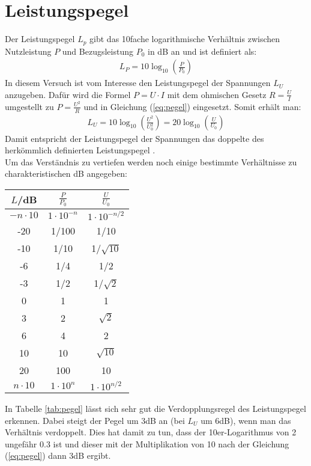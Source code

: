 \section{Leistungspegel}
\label{sec:pegel}
Der Leistungspegel $L_p$ gibt das 10fache logarithmische Verhältnis zwischen Nutzleistung $P$ und Bezugsleistung $P_0$ in \si{\deci\bel} an und ist definiert als:
\begin{gather}
    L_P = 10 \log_{10}\left(\frac{P}{P_0}\right)
    \label{eq:pegel}
\end{gather}
In diesem Versuch ist vom Interesse den Leistungspegel der Spannungen $L_U$ anzugeben. Dafür wird die Formel $P = U \cdot I$ mit dem ohmischen Gesetz $R = \frac{U}{I}$ umgestellt zu $P = \frac{U^2}{R}$ und in Gleichung (\ref{eq:pegel}) eingesetzt. Somit erhält man:
\begin{gather}
    L_U = 10 \log_{10}\left(\frac{U^2}{U_0^2}\right) = 20 \log_{10}\left(\frac{U}{U_0}\right)
    \label{eq:spannungpegel}
\end{gather}
Damit entspricht der Leistungspegel der Spannungen das doppelte des herkömmlich definierten Leistungspegel \citep{electronik}.\\
Um das Verständnis zu vertiefen werden noch einige bestimmte Verhältnisse zu charakteristischen \si{\deci\bel} angegeben:
\begin{center}
    \begin{tabular}{c | c c}
        $L$/dB & $\frac{P}{P_0}$ & $\frac{U}{U_0}$\\
        \hline
        $-n\cdot10$ & $1\cdot10^{-n}$ &  $1\cdot10^{-n/2}$ \\
        -20 & 1/100 & 1/10 \\
        -10 & 1/10 & 1/$\sqrt{10}$ \\
        -6 & 1/4 & 1/2\\
        -3 & 1/2 & 1/$\sqrt{2}$\\
        0 & 1 & 1\\
        3 & 2 & $\sqrt{2}$\\
        6 & 4 & 2\\
        10 & 10 & $\sqrt{10}$ \\
        20 & 100 & 10 \\
        $n\cdot10$ & $1\cdot10^{n}$ &  $1\cdot10^{n/2}$ \\
    \end{tabular}
    \label{tab:pegel}
\end{center}
In Tabelle \ref{tab:pegel} lässt sich sehr gut die Verdopplungsregel des Leistungspegel erkennen. Dabei steigt der Pegel um 3dB an (bei $L_U$ um 6dB), wenn man das Verhältnis verdoppelt. Dies hat damit zu tun, dass der 10er-Logarithmus von 2 ungefähr 0.3 ist und dieser mit der Multiplikation von 10 nach der Gleichung (\ref{eq:pegel}) dann 3dB ergibt.
\newpage
